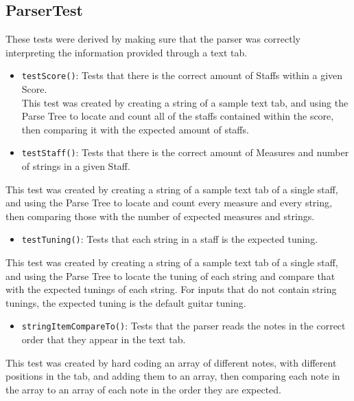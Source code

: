 \documentclass[11pt]{article}
\begin{document}
\subsection{ParserTest}
\label{sec:org0410c3e}
These tests were derived by making sure that the parser was correctly interpreting the information provided through a text tab.\\
\begin{itemize}
\item \texttt{testScore()}: Tests that there is the correct amount of Staffs within a given Score.\\
This test was created by creating a string of a sample text tab, and using the Parse Tree to locate and count all of the staffs contained within the score, then comparing it with the expected amount of staffs.\\
\item \texttt{testStaff()}: Tests that there is the correct amount of Measures and number of strings in a given Staff.\\
\end{itemize}
This test was created by creating a string of a sample text tab of a single staff, and using the Parse Tree to locate and count every measure and every string, then comparing those with the number of expected measures and strings.\\
\begin{itemize}
\item \texttt{testTuning()}: Tests that each string in a staff is the expected tuning.\\
\end{itemize}
This test was created by creating a string of a sample text tab of a single staff, and using the Parse Tree to locate the tuning of each string and compare that with the expected tunings of each string. For inputs that do not contain string tunings, the expected tuning is the default guitar tuning.\\
\begin{itemize}
\item \texttt{stringItemCompareTo()}: Tests that the parser reads the notes in the correct order that they appear in the text tab.\\
\end{itemize}
This test was created by hard coding an array of different notes, with different positions in the tab, and adding them to an array, then comparing each note in the array to an array of each note in the order they are expected.\\
\end{document}
